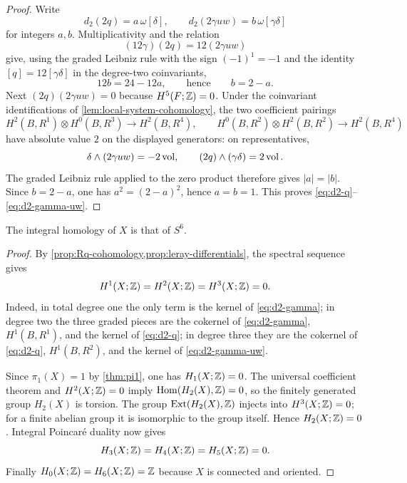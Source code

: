 \begin{proof}
Write
\[
 d_2(2q)=a\,\omega[\delta],
 \qquad
 d_2(2\gamma uw)=b\,\omega[\gamma\delta]
\]
for integers $a,b$.  Multiplicativity and the relation
\[
 (12\gamma)(2q)=12(2\gamma uw)
\]
give, using the graded Leibniz rule with the sign $(-1)^1=-1$ and the
identity $[q]=12[\gamma\delta]$ in the degree-two coinvariants,
\[
 12b=24-12a,
 \qquad\text{hence}\qquad b=2-a.
\]
Next $(2q)(2\gamma uw)=0$ because $H^5(F;\mathbb Z)=0$.  Under the
coinvariant identifications of \cref{lem:local-system-cohomology}, the two
coefficient pairings
\[
 H^2(B,R^1)\otimes H^0(B,R^3)\longrightarrow H^2(B,R^4),
 \qquad
 H^0(B,R^2)\otimes H^2(B,R^2)\longrightarrow H^2(B,R^4)
\]
have absolute value $2$ on the displayed generators: on representatives,
\[
 \delta\wedge(2\gamma uw)=-2\operatorname{vol},
 \qquad
 (2q)\wedge(\gamma\delta)=2\operatorname{vol}.
\]
The graded Leibniz rule applied to the zero product therefore gives
$|a|=|b|$.  Since $b=2-a$, one has $a^2=(2-a)^2$, hence $a=b=1$.
This proves
\eqref{eq:d2-q}--\eqref{eq:d2-gamma-uw}.
\end{proof}

\begin{theorem}\label{thm:integral-cohomology}
The integral homology of $X$ is that of $S^6$.
\end{theorem}

\begin{proof}
By \cref{prop:Rq-cohomology,prop:leray-differentials}, the spectral
sequence gives
\[
 H^1(X;\mathbb Z)=H^2(X;\mathbb Z)=H^3(X;\mathbb Z)=0.
\]
Indeed, in total degree one the only term is the kernel of
\eqref{eq:d2-gamma}; in degree two the three graded pieces are the
cokernel of \eqref{eq:d2-gamma}, $H^1(B,R^1)$, and the kernel of
\eqref{eq:d2-q}; in degree three they are the cokernel of
\eqref{eq:d2-q}, $H^1(B,R^2)$, and the kernel of
\eqref{eq:d2-gamma-uw}.

Since $\pi_1(X)=1$ by \cref{thm:pi1}, one has $H_1(X;\mathbb Z)=0$.
The universal coefficient theorem and $H^2(X;\mathbb Z)=0$ imply
$\operatorname{Hom}(H_2(X),\mathbb Z)=0$, so the finitely generated group $H_2(X)$ is torsion.
The group $\operatorname{Ext}(H_2(X),\mathbb Z)$ injects into $H^3(X;\mathbb Z)=0$;
for a finite abelian group it is isomorphic to the group itself.  Hence
$H_2(X;\mathbb Z)=0$.  Integral Poincaré duality now gives
\[
 H_3(X;\mathbb Z)=H_4(X;\mathbb Z)=H_5(X;\mathbb Z)=0.
\]
Finally $H_0(X;\mathbb Z)=H_6(X;\mathbb Z)=\mathbb Z$ because $X$ is connected and oriented.
\end{proof}

